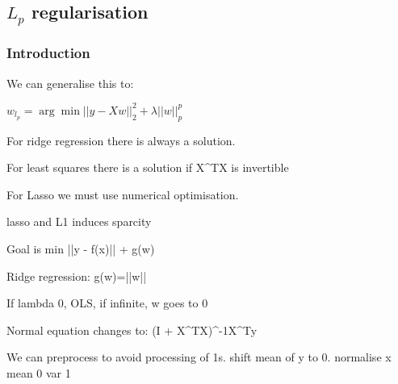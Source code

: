
\subsection{\(L_p\) regularisation}

\subsubsection{Introduction}

We can generalise this to:

\(w_{l_p} = \arg \min ||y-Xw||^2_2+\lambda ||w||^p_p\)

For ridge regression there is always a solution.

For least squares there is a solution if X^TX is invertible

For Lasso we must use numerical optimisation.

lasso and L1 induces sparcity

Goal is min ||y - f(x)|| + \lambda g(w)

Ridge regression: g(w)=||w||

If lambda 0, OLS, if infinite, w goes to 0

Normal equation changes to: (\lambda I + X^TX)^{-1}X^Ty

We can preprocess to avoid processing of 1s. shift mean of y to 0. normalise x mean 0 var 1


